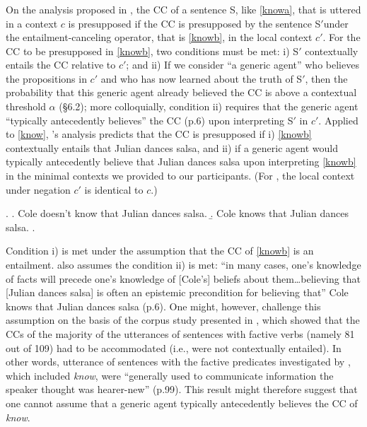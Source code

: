 \documentclass[a4paper,12pt,twoside]{article}
\newcommand{\poscite}[1]{\citeauthor{#1}'s \citeyear{#1}}
\begin{document}
\subsubsection{\citealt{schlenker_triggering_2021}}

On the analysis proposed in \citealt{schlenker_triggering_2021}, the CC of a sentence S, like \ref{knowa}, that is uttered in a context $c$ is presupposed if the CC is presupposed by the sentence S$'$under the entailment-canceling operator, that is \ref{knowb}, in the local context $c'$. For the CC to be presupposed in \ref{knowb}, two conditions must be met: i) S$'$ contextually entails the CC relative to $c'$; and ii) If we consider ``a generic agent'' who believes the propositions in $c'$ and who has now learned about the truth of S$'$, then the probability that this generic agent already believed the CC is above a contextual threshold $\alpha$ (\S6.2); more colloquially, condition ii) requires that the generic agent ``typically antecedently believes'' the CC (p.6) upon interpreting S$'$ in $c'$. Applied to \ref{know}, \poscite{schlenker_triggering_2021} analysis predicts that the CC  is presupposed if i) \ref{knowb} contextually entails that Julian dances salsa, and ii) if a generic agent would typically antecedently believe that Julian dances salsa upon interpreting \ref{knowb} in the minimal contexts we provided to our participants. (For \citealt{schlenker_triggering_2021}, the local context under negation $c'$ is identical to $c$.)

\ex.\label{know} 
\a.\label{knowa} Cole doesn't know that Julian dances salsa.
\b.\label{knowb} Cole knows that Julian dances salsa.
\z.

Condition i) is met under the assumption that the CC of \ref{knowb} is an entailment. \citealt{schlenker_triggering_2021} also assumes the condition ii) is met: ``in many cases, one's knowledge of facts will precede one's knowledge of [Cole's] beliefs about them\ldots believing that [Julian dances salsa] is often an epistemic precondition for believing that'' Cole knows that Julian dances salsa (p.6). One might, however, challenge this assumption on the basis of the corpus study presented in \citealt{spenader02}, which showed that the CCs of the majority of the utterances of sentences with factive verbs (namely 81 out of 109) had to be accommodated (i.e., were not contextually entailed). In other words, utterance of sentences with the factive predicates investigated by \citet{spenader02}, which included \emph{know}, were ``generally used to communicate information the speaker thought was hearer-new'' (p.99). This result might therefore suggest that one cannot assume that a generic agent typically antecedently believes the CC of {\em know}.
\end{document}
